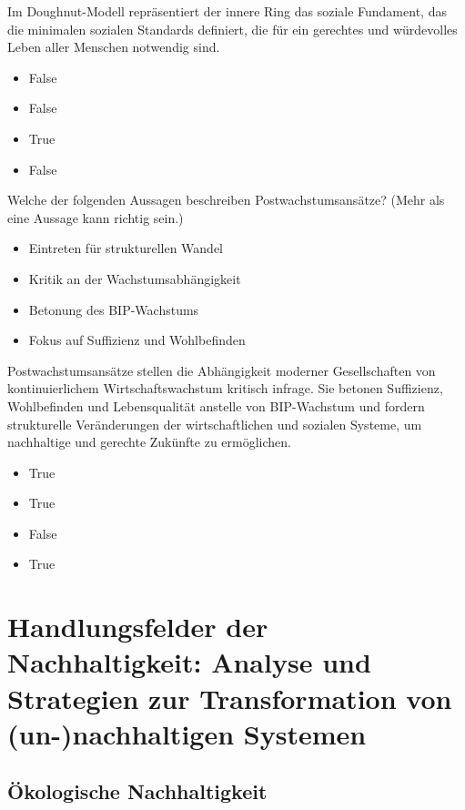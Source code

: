\documentclass[
  nswissgerman,
  a4paper,
  DIV=11,
  numbers=noendperiod,
  oneside,
  openany]{scrreprt}
\providecommand{\tightlist}{%
  \setlength{\itemsep}{0pt}\setlength{\parskip}{0pt}}
\begin{document}
Im Doughnut-Modell repräsentiert der innere Ring das soziale Fundament,
das die minimalen sozialen Standards definiert, die für ein gerechtes
und würdevolles Leben aller Menschen notwendig sind.

\begin{itemize}
\tightlist
\item
  False
\item
  False
\item
  True
\item
  False
\end{itemize}

Welche der folgenden Aussagen beschreiben Postwachstumsansätze? (Mehr
als eine Aussage kann richtig sein.)

\begin{itemize}
\tightlist
\item[$\square$]
  Eintreten für strukturellen Wandel
\item[$\square$]
  Kritik an der Wachstumsabhängigkeit
\item[$\square$]
  Betonung des BIP-Wachstums
\item[$\square$]
  Fokus auf Suffizienz und Wohlbefinden
\end{itemize}

Postwachstumsansätze stellen die Abhängigkeit moderner Gesellschaften
von kontinuierlichem Wirtschaftswachstum kritisch infrage. Sie betonen
Suffizienz, Wohlbefinden und Lebensqualität anstelle von BIP-Wachstum
und fordern strukturelle Veränderungen der wirtschaftlichen und sozialen
Systeme, um nachhaltige und gerechte Zukünfte zu ermöglichen.

\begin{itemize}
\tightlist
\item
  True
\item
  True
\item
  False
\item
  True
\end{itemize}

\part{Handlungsfelder der Nachhaltigkeit: Analyse und Strategien zur
Transformation von (un-)nachhaltigen Systemen}

\chapter{Ökologische
Nachhaltigkeit}\label{uxf6kologische-nachhaltigkeit}
\end{document}
